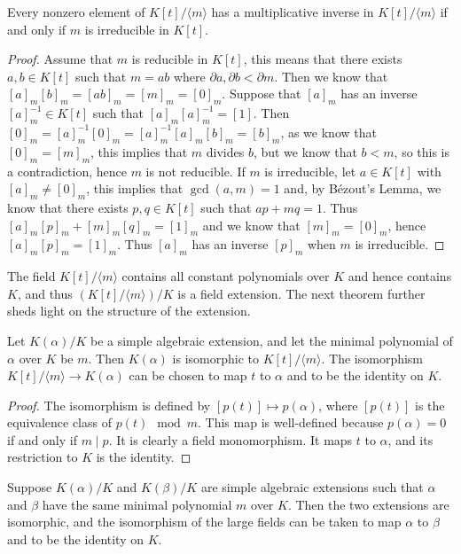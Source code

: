 \begin{theorem} \label{thm:irreducible-mod-field}
	Every nonzero element of $K[t] /\langle m\rangle$ has a multiplicative inverse in $K[t] /\langle m\rangle$ if and only if $m$ is irreducible in $K[t]$.
\end{theorem}

\begin{proof}
	Assume that \(m\) is reducible in \(K[t]\), this means that there exists \(a,b \in K[t]\) such that \(m = ab\) where \(\partial a,\partial b < \partial m\). Then we know that \([a]_m[b]_m = [ab]_m = [m]_m = [0]_m\). Suppose that \([a]_m\) has an inverse \([a]_m^{-1} \in K[t]\) such that \([a]_m[a]_m^{-1} = [1]\). Then \([0]_m = [a]_m^{-1}[0]_m = [a]_m^{-1}[a]_m[b]_m = [b]_m\), as we know that \([0]_m = [m]_m\), this implies that \(m\) divides \(b\), but we know that \(b < m\), so this is a contradiction, hence \(m\) is not reducible. 
	If \(m\) is irreducible, let \(a \in K[t]\) with \([a]_m \neq [0]_m\), this implies that \(\gcd(a,m)=1\) and, by Bézout's Lemma, we know that there exists \(p,q \in K[t]\) such that \(ap + mq = 1\). Thus \([a]_m[p]_m + [m]_m[q]_m = [1]_m\) and we know that \([m]_m = [0]_m\), hence \([a]_m[p]_m = [1]_m\). Thus \([a]_m\) has an inverse \([p]_m\) when \(m\) is irreducible.
\end{proof}

The field $K[t] / \langle m \rangle$ contains all constant polynomials over $K$ and hence contains $K$, and thus $\left(K[t] / \langle m \rangle \right) / K$ is a field extension. The next theorem further sheds light on the structure of the extension. 

\begin{theorem}
    Let $K(\alpha) / K$ be a simple algebraic extension, and let the minimal polynomial of $\alpha$ over $K$ be $m$. Then $K(\alpha)$ is isomorphic to $K[t] /\langle m\rangle$. The isomorphism $K[t] /\langle m\rangle \rightarrow K(\alpha)$ can be chosen to map $t$ to $\alpha$ and to be the identity on $K$.
\end{theorem}

\begin{proof}
The isomorphism is defined by $[p(t)] \mapsto p(\alpha)$, where $[p(t)]$ is the equivalence class of $p(t)\mod m$. This map is well-defined because $p(\alpha)=0$ if and only if $m \mid p$. It is clearly a field monomorphism. It maps $t$ to $\alpha$, and its restriction to $K$ is the identity.
\end{proof}

\begin{corollary} \label{thm:minimal-polynomial-roots-isomorphic}
    Suppose $K(\alpha) / K$ and $K(\beta) / K$ are simple algebraic extensions such that $\alpha$ and $\beta$ have the same minimal polynomial $m$ over $K$. Then the two extensions are isomorphic, and the isomorphism of the large fields can be taken to map $\alpha$ to $\beta$ and to be the identity on $K$.
\end{corollary}

